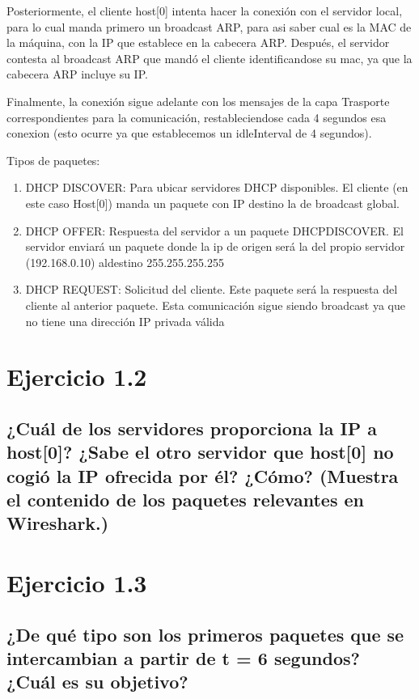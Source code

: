 Posteriormente, el cliente host[0] intenta hacer la conexión con el servidor local, para lo cual manda primero un broadcast ARP, para asi saber 
cual es la MAC de la máquina, con la IP que establece en la cabecera ARP. Después, el servidor contesta al broadcast ARP que mandó el cliente identificandose su mac, ya que la cabecera ARP incluye su IP.

Finalmente, la conexión sigue adelante con los mensajes de la capa Trasporte correspondientes para la comunicación, restableciendose cada 4 segundos esa conexion (esto ocurre ya que establecemos un idleInterval de 4 segundos).

Tipos de paquetes:

\begin{enumerate}
    \item DHCP DISCOVER: Para ubicar servidores DHCP disponibles. El cliente (en este caso Host[0]) manda un paquete con IP destino la de broadcast global.
    \item DHCP OFFER: Respuesta del servidor a un paquete DHCPDISCOVER. El servidor enviará un paquete donde la ip de origen será la del propio servidor (192.168.0.10) aldestino 255.255.255.255
    \item DHCP REQUEST: Solicitud del cliente. Este paquete será la respuesta del cliente al anterior paquete. Esta comunicación sigue siendo broadcast ya que no tiene una dirección IP privada válida
\end{enumerate}


\section{Ejercicio 1.2}

\subsection{¿Cuál de los servidores proporciona la IP a host[0]? ¿Sabe el otro servidor que host[0] no cogió la IP ofrecida por él? ¿Cómo? (Muestra el contenido de los paquetes relevantes en Wireshark.)}


\section{Ejercicio 1.3}

\subsection{¿De qué tipo son los primeros paquetes que se intercambian a partir de t = 6 segundos? ¿Cuál es su objetivo?}

